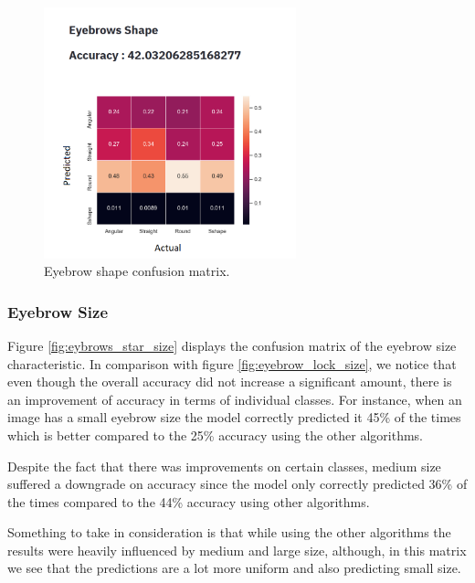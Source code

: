 \documentclass[12pt,a4paper,oneside]{memoir}
\begin{document}
\begin{figure}[H]
\centering
\includegraphics[width=0.65\textwidth]{images/eyebrows_star_shape.png}
\caption{Eyebrow shape confusion matrix.}
\centering
\label{fig:eybrows_star_shape}
\end{figure}



\subsubsection{Eyebrow Size}
Figure \ref{fig:eybrows_star_size} displays the confusion matrix of the eyebrow size characteristic. In comparison with figure \ref{fig:eyebrow_lock_size}, we notice that even though the overall accuracy did not increase a significant amount, there is an improvement of accuracy in terms of individual classes. For instance, when an image has a small eyebrow size the model correctly predicted it 45\% of the times which is better compared to the 25\% accuracy using the other algorithms. 

\par

Despite the fact that there was improvements on certain classes, medium size suffered a downgrade on accuracy since the model only correctly predicted 36\% of the times compared to the 44\% accuracy using other algorithms.

\par

Something to take in consideration is that while using the other algorithms the results were heavily influenced by medium and large size, although, in this matrix we see that the predictions are a lot more uniform and also predicting small size.
\end{document}
